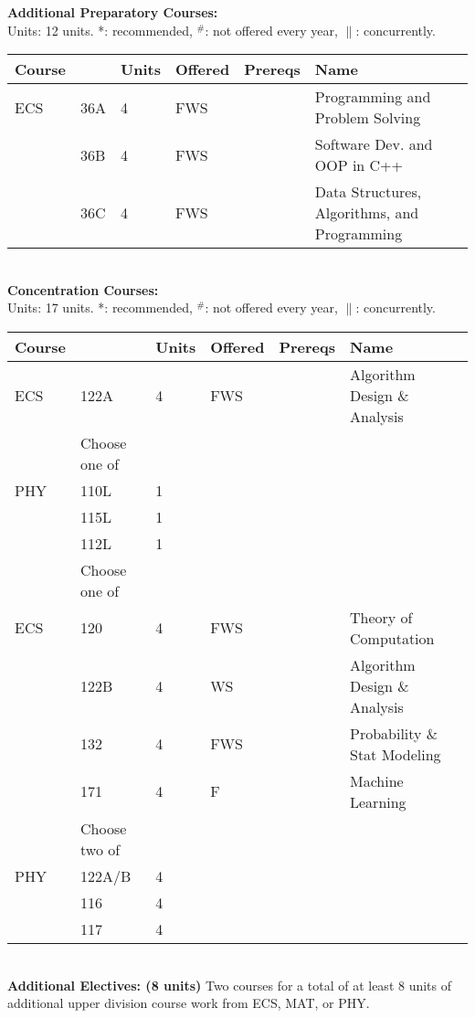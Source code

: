 \documentclass[12pt]{article}
\begin{document}
\newpage
{}
\vskip 0.25cm
\noindent
{\bf Additional Preparatory Courses:  }\\
Units:  12 units. *: recommended, $^\#$: not offered every year, $\parallel$: concurrently.\\
\begin{tabular}{|llllll|}
\hline
Course & & Units & Offered & Prereqs & Name \\
\hline
ECS & 36A  & 4 & FWS & & Programming and Problem Solving\\
    & 36B  & 4 & FWS & & Software Dev. and OOP in C++\\
    & 36C  & 4 & FWS & & Data Structures, Algorithms, and Programming\\
\hline
\end{tabular}\\
\vskip 0.25cm
\noindent
{\bf Concentration Courses:  }\\
Units:  17 units. *: recommended, $^\#$: not offered every year, $\parallel$: concurrently.\\
\begin{tabular}{|llllll|}
\hline
Course & & Units & Offered & Prereqs & Name \\
\hline
ECS & 122A & 4 & FWS & & Algorithm Design \& Analysis\\
\hline
\hline
    & Choose one of & & & & \\
\hline
PHY    & 110L & 1 & & & \\
    & 115L & 1 & & & \\
    & 112L & 1 & & & \\
\hline
\hline
    & Choose one of & & & & \\
\hline
ECS & 120  & 4 & FWS & & Theory of Computation \\
    & 122B & 4 & WS  & & Algorithm Design \& Analysis \\
    & 132  & 4 & FWS & & Probability \& Stat Modeling \\
    & 171  & 4 & F   & & Machine Learning \\
\hline
\hline
    & Choose two of & & & & \\
\hline
PHY & 122A/B & 4 & & & \\
    & 116   & 4 & & & \\
    & 117   & 4 & & & \\
\hline
\end{tabular}\\
\vskip 0.25cm
\noindent
{\bf Additional Electives: (8 units)} Two courses for a total of at least 8 units of additional upper division course work from ECS, MAT, or PHY.\\
\end{document}
